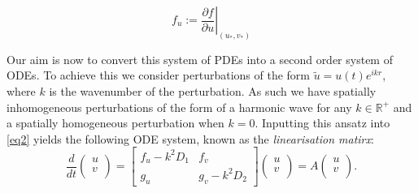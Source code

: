 \documentclass[12pt]{article}
\begin{document}
\begin{equation}\label{fu}
f_u := \left. \frac{\partial{f}}{\partial{u}}\right|_{(u_\ast,v_\ast)}
\end{equation}
 
 Our aim is now to convert this system of PDEs into a second order system of ODEs. To achieve this we consider perturbations of the form $\tilde{u} = u(t)e^{ikr}$, where $k$ is the wavenumber of the perturbation. As such we have spatially inhomogeneous perturbations of the form of a harmonic wave for any $k \in \mathbb{R}^+$ and a spatially homogeneous perturbation when $k=0$. Inputting this ansatz into \eqref{eq2} yields the following ODE system, known as the \textit{linearisation matirx}:
\begin{equation}\label{linsys}
    \frac{d}{dt} 
    \left(
    \begin{array}{c}
    u\\
    v\\
    \end{array}
    \right)
    = 
    \left[
    \begin{array}{cc}
      f_u - k^2D_1   & f_v \\
      g_u   &  g_v - k^2D_2
    \end{array}
    \right]
    \left(
    \begin{array}{c}
    u\\
    v\\
    \end{array}
    \right)
 = A 
     \left(
    \begin{array}{c}
    u\\
    v\\
    \end{array}
    \right).
\end{equation}
\end{document}
